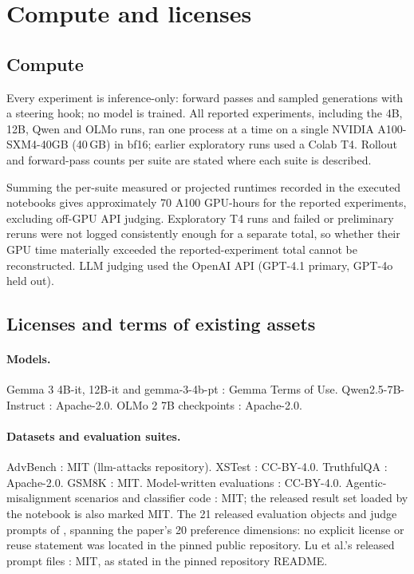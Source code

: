 \FloatBarrier

\section{Compute and licenses}
\label{app:compute}

\subsection{Compute}

Every experiment is inference-only: forward passes and sampled generations
with a steering hook; no model is trained. All reported
experiments, including the 4B, 12B, Qwen and OLMo runs, ran one process at a
time on a single NVIDIA A100-SXM4-40GB (40\,GB) in bf16; earlier exploratory
runs used a Colab T4. Rollout and forward-pass counts per suite are stated
where each suite is described.

Summing the per-suite
measured or projected runtimes recorded in the executed notebooks gives
approximately 70 A100 GPU-hours for the reported experiments,
excluding off-GPU API judging. Exploratory T4 runs and failed or
preliminary reruns were not logged consistently enough for a separate total,
so whether their GPU time materially exceeded the reported-experiment total
cannot be reconstructed. LLM judging used the OpenAI API (GPT-4.1 primary,
GPT-4o held out).

\subsection{Licenses and terms of existing assets}

\paragraph{Models.}
Gemma 3 4B-it, 12B-it and
gemma-3-4b-pt \citep{gemma3}: Gemma Terms of Use. Qwen2.5-7B-Instruct
\citep{qwen25}: Apache-2.0. OLMo 2 7B checkpoints \citep{olmo2}: Apache-2.0.

\paragraph{Datasets and evaluation suites.}
AdvBench \citep{zou2023gcg}: MIT (llm-attacks repository). XSTest
\citep{rottger2023xstest}: CC-BY-4.0. TruthfulQA \citep{lin2021truthfulqa}:
Apache-2.0. GSM8K \citep{cobbe2021gsm8k}: MIT. Model-written evaluations
\citep{perez2022evals}: CC-BY-4.0. Agentic-misalignment scenarios and
classifier code \citep{lynch2025agentic}: MIT; the released result set loaded
by the notebook \citep{fahlgren2026agenticmisalignment} is also marked MIT.
The 21 released evaluation objects and judge prompts of
\citet{chua2026consciousness}, spanning the paper's 20 preference dimensions:
no explicit license or reuse statement was located in the pinned public
repository. Lu et al.'s released prompt files
\citep{lu2026assistant}: MIT, as stated in the pinned repository README.


